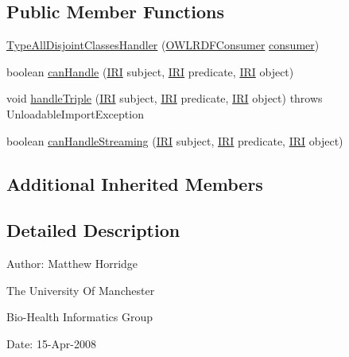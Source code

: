 \subsection*{Public Member Functions}
\begin{DoxyCompactItemize}
\item 
\hyperlink{classorg_1_1coode_1_1owlapi_1_1rdfxml_1_1parser_1_1_type_all_disjoint_classes_handler_a87f744998e6762f2042fe6c4300f533b}{Type\-All\-Disjoint\-Classes\-Handler} (\hyperlink{classorg_1_1coode_1_1owlapi_1_1rdfxml_1_1parser_1_1_o_w_l_r_d_f_consumer}{O\-W\-L\-R\-D\-F\-Consumer} \hyperlink{classorg_1_1coode_1_1owlapi_1_1rdfxml_1_1parser_1_1_abstract_triple_handler_a4ccf4d898ff01eb1cadfa04b23d54e9c}{consumer})
\item 
boolean \hyperlink{classorg_1_1coode_1_1owlapi_1_1rdfxml_1_1parser_1_1_type_all_disjoint_classes_handler_a6388e851454db2c275a8d95602ae0bc9}{can\-Handle} (\hyperlink{classorg_1_1semanticweb_1_1owlapi_1_1model_1_1_i_r_i}{I\-R\-I} subject, \hyperlink{classorg_1_1semanticweb_1_1owlapi_1_1model_1_1_i_r_i}{I\-R\-I} predicate, \hyperlink{classorg_1_1semanticweb_1_1owlapi_1_1model_1_1_i_r_i}{I\-R\-I} object)
\item 
void \hyperlink{classorg_1_1coode_1_1owlapi_1_1rdfxml_1_1parser_1_1_type_all_disjoint_classes_handler_a2c41d177e4f7d8b84b394c6333197257}{handle\-Triple} (\hyperlink{classorg_1_1semanticweb_1_1owlapi_1_1model_1_1_i_r_i}{I\-R\-I} subject, \hyperlink{classorg_1_1semanticweb_1_1owlapi_1_1model_1_1_i_r_i}{I\-R\-I} predicate, \hyperlink{classorg_1_1semanticweb_1_1owlapi_1_1model_1_1_i_r_i}{I\-R\-I} object)  throws Unloadable\-Import\-Exception 
\item 
boolean \hyperlink{classorg_1_1coode_1_1owlapi_1_1rdfxml_1_1parser_1_1_type_all_disjoint_classes_handler_a68817d3ac567d4491982c466623cc006}{can\-Handle\-Streaming} (\hyperlink{classorg_1_1semanticweb_1_1owlapi_1_1model_1_1_i_r_i}{I\-R\-I} subject, \hyperlink{classorg_1_1semanticweb_1_1owlapi_1_1model_1_1_i_r_i}{I\-R\-I} predicate, \hyperlink{classorg_1_1semanticweb_1_1owlapi_1_1model_1_1_i_r_i}{I\-R\-I} object)
\end{DoxyCompactItemize}
\subsection*{Additional Inherited Members}


\subsection{Detailed Description}
Author\-: Matthew Horridge\par
 The University Of Manchester\par
 Bio-\/\-Health Informatics Group\par
 Date\-: 15-\/\-Apr-\/2008\par
\par
 

